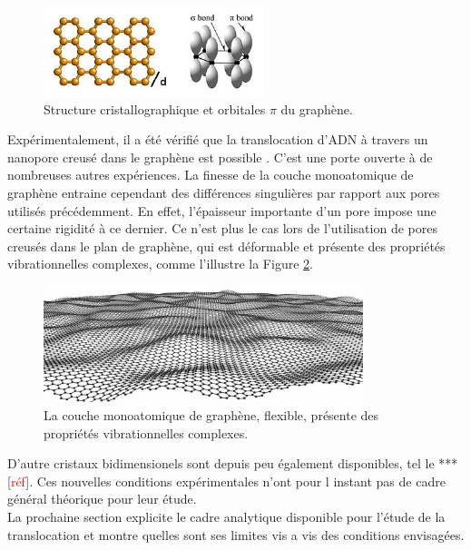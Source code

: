 \documentclass[a4paper,11pt]{article}
\begin{document}
\begin{figure}[H]
\begin{center}
\includegraphics[width=0.57\textwidth]{orbitals2.jpg} 
\caption{Structure cristallographique et orbitales $\pi$ du graphène.}
\label{orbit}
\end{center}
\end{figure}
 
Expérimentalement, il a été vérifié que la translocation d'ADN à travers un nanopore creusé dans le graphène est possible \cite{dnatrans}. C'est une porte ouverte à de nombreuses autres expériences. La finesse de la couche monoatomique de graphène entraine cependant des différences singulières par rapport aux pores utilisés précédemment. En effet, l'épaisseur importante d'un pore impose une certaine rigidité à ce dernier. Ce n'est plus le cas lors de l'utilisation de pores creusés dans le plan de graphène, qui est déformable et présente des propriétés vibrationnelles complexes, comme l'illustre la Figure \ref{vib}.


\begin{figure}[H]
\begin{center}
\includegraphics[width=0.83\textwidth]{vib.jpg} 
\caption{La couche monoatomique de graphène, flexible, présente des propriétés vibrationnelles complexes.}
\label{vib}
\end{center}
\end{figure}

D'autre cristaux bidimensionels sont depuis peu également disponibles, tel le *** [\textcolor{red}{réf}]. Ces nouvelles conditions expérimentales n'ont pour l instant pas de cadre général théorique pour leur étude.\\

La prochaine section explicite le cadre analytique disponible pour l'étude de la translocation et montre quelles sont ses limites vis a vis des conditions  envisagées.
\end{document}
